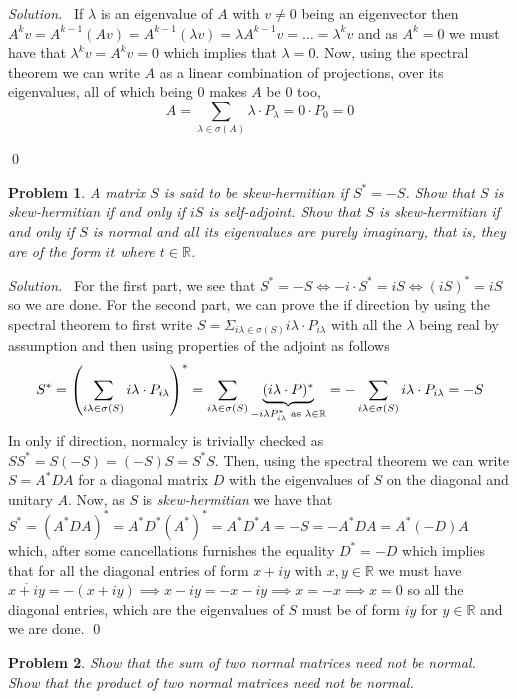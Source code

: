 \documentclass[12pt,a4paper]{article}
\newenvironment{solution}{%
  \par\noindent\textit{Solution.}\ }{\qed}
\theoremstyle{problemstyle}
\newtheorem{problem}{Problem}[section]
\def\bR{\mathbb{R}}
\begin{document}
\begin{solution}
	If $\lambda$ is an eigenvalue of $A$ with $v\neq 0$ being an eigenvector then $A^kv=A^{k-1}(Av)=A^{k-1}(\lambda v)=\lambda A^{k-1}v=\ldots=\lambda^kv$ and as $A^k=0$ we must have that $\lambda^kv=A^kv=0$ which implies that $\lambda=0$. Now, using the spectral theorem we can write $A$ as a linear combination of projections, over its eigenvalues, all of which being $0$ makes $A$ be $0$ too,
\[
	A = \sum_{\lambda\in\sigma(A)}\lambda\cdot P_\lambda=0\cdot P_0=0
\]

\end{solution}
\begin{problem}\label{prob:3-3}
A matrix $S$ is said to be \textit{skew-hermitian} if $S^* = -S$. Show that $S$ is skew-hermitian if and only if $iS$ is self-adjoint. Show that $S$ is skew-hermitian if and only if $S$ is normal and all its eigenvalues are purely imaginary, that is, they are of the form $it$ where $t \in \mathbb{R}$.
\end{problem}
\begin{solution}
	For the first part, we see that $S^*=-S\iff -i\cdot S^*=iS\iff (iS)^*=iS$ so we are done. For the second part, we can prove the if direction by using the spectral theorem to first write $S=\Sigma_{i\lambda\in\sigma(S)}i\lambda\cdot P_{i\lambda}$ with all the $\lambda$ being real by assumption and then using properties of the adjoint as follows
\[
	S^*=\qty(\sum_{i\lambda\in\sigma(S)}i\lambda\cdot P_{i\lambda})^*=\sum_{i\lambda\in\sigma(S)}\underbrace{(i\lambda\cdot P)^*}_{-i\lambda P_{i\lambda}^*\text{ as }\lambda\in\bR}=-\sum_{i\lambda\in\sigma(S)}i\lambda\cdot P_{i\lambda}=-S
\]
In only if direction, normalcy is trivially checked as $SS^*=S(-S)=(-S)S=S^*S$. Then, using the spectral theorem we can write $S=A^*DA$ for a diagonal matrix $D$ with the eigenvalues of $S$ on the diagonal and unitary $A$. Now, as $S$ is \textit{skew-hermitian} we have that $S^*=(A^*DA)^*=A^*D^*(A^*)^*=A^*D^*A=-S=-A^*DA=A^*(-D)A$ which, after some cancellations furnishes the equality $D^*=-D$ which implies that for all the diagonal entries of form $x+iy$ with $x,y\in\bR$ we must have $\overline{x+iy}=-(x+iy)\implies x-iy=-x-iy\implies x=-x\implies x=0$ so all the diagonal entries, which are the eigenvalues of $S$ must be of form $iy$ for $y\in\bR$ and we are done.
\end{solution}
\begin{problem}\label{prob:3-4}
Show that the sum of two normal matrices need not be normal. Show that the product of two normal matrices need not be normal.
\end{problem}
\end{document}
